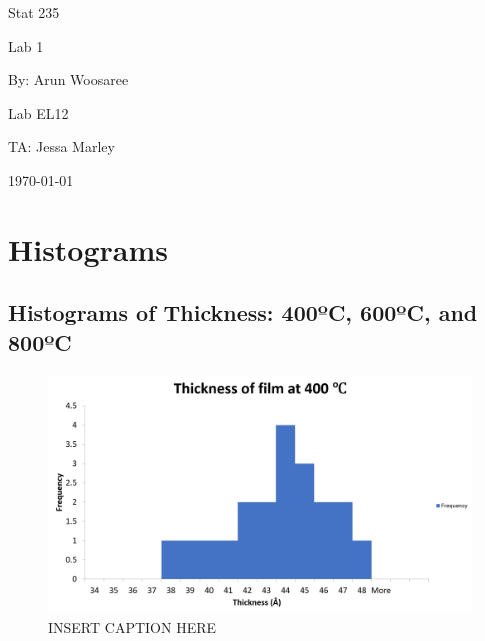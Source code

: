 \documentclass[letterpaper]{article}
\begin{document}
\begin{titlepage}
 \begin{center}
  \vspace*{1cm}
  \Huge
  Stat 235
  \vspace{1cm}
  
  Lab 1
  \vspace{1cm}
  
  By: Arun Woosaree
  \vspace{1cm}
  
  \Huge
  Lab EL12
  \vspace{1cm}
  
  TA: Jessa Marley
  \vspace{1cm}
  
  \today
  \vfill
 \end{center}
\end{titlepage}

\section{Histograms}

\subsection{Histograms of Thickness: 400ºC, 600ºC, and 800ºC}

\begin{figure}[H]
 \centering
 \includegraphics[width=\textwidth]{thicc400.png}
 \caption{INSERT CAPTION HERE}
 \label{thicc400}
\end{figure}
\end{document}
